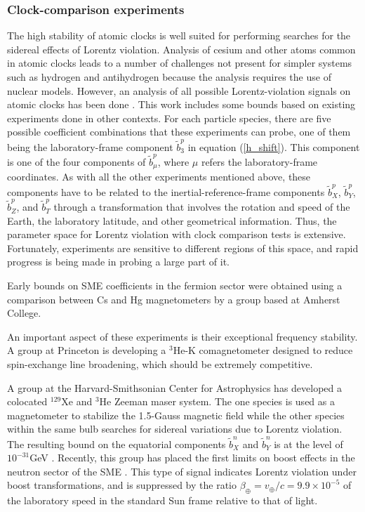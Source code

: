 \documentclass[twocolumn]{revtex4}
\def\be{\beta}
\def\bt{\tilde b}
\begin{document}
\subsubsection{Clock-comparison experiments}
The high stability of atomic clocks
is well suited for performing searches for
the sidereal effects of Lorentz violation.
Analysis of cesium and other atoms
common in atomic clocks leads to a number of
challenges not present for simpler systems
such as hydrogen and antihydrogen
because the analysis requires the use of
nuclear models.
However,
an analysis of all possible Lorentz-violation
signals on atomic clocks has been done \cite{akcl}.
This work includes some bounds based
on existing experiments done in other contexts.
For each particle species,
there are five possible coefficient combinations
that these experiments can probe,
one of them being the laboratory-frame component
$\bt^p_3$
in equation (\ref{h_shift}).
This component is one of the four components of
$\bt^p_\mu$,
where $\mu$ refers the laboratory-frame coordinates.
As with all the other experiments mentioned above,
these components have to be related to the
inertial-reference-frame components
$\bt^p_X$,
$\bt^p_Y$,
$\bt^p_Z$,
and $\bt^p_T$
through a transformation that involves
the rotation and speed of the Earth,
the laboratory latitude,
and other geometrical information.
Thus,
the parameter space for Lorentz violation
with clock comparison tests is extensive.
Fortunately,
experiments are sensitive to different
regions of this space,
and rapid progress is being made in probing a large part of it.

Early bounds on SME coefficients
in the fermion sector were obtained using a comparison between
Cs and Hg magnetometers \cite{hunter}
by a group based at Amherst College.

An important aspect of these experiments
is their exceptional frequency stability.
A group at Princeton \cite{romalis}
is developing a $^3$He-K comagnetometer
designed to reduce spin-exchange line broadening,
which should be extremely competitive.

A group at the Harvard-Smithsonian
Center for Astrophysics has developed
a colocated $^{129}$Xe and $^3$He Zeeman maser system.
The one species is used as a magnetometer to
stabilize the 1.5-Gauss magnetic field
while the other species within the same bulb
searches for sidereal variations
due to Lorentz violation.
The resulting bound on the equatorial components
$\bt^n_X$ and $\bt^n_Y$
is at the level of $10^{-31}$GeV \cite{HeNeMaser}.
Recently,
this group has placed the first limits on boost effects
in the neutron sector of the SME \cite{boosts neutron}.
This type of signal indicates Lorentz violation
under boost transformations,
and is suppressed by the ratio
$\be_\oplus = v_\oplus/c = 9.9 \times 10^{-5}$
of the laboratory speed in the standard Sun frame
relative to that of light.
\end{document}
